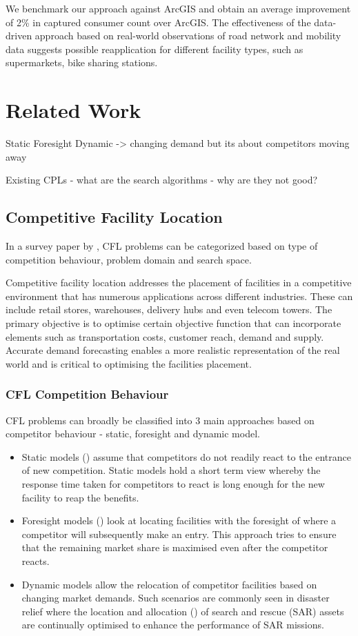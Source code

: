 \documentclass{ecai}
\begin{document}
We benchmark our approach against ArcGIS and obtain an average improvement of 2\% in captured consumer count over ArcGIS. The effectiveness of the data-driven approach based on real-world observations of road network and mobility data suggests possible reapplication for different facility types, such as supermarkets, bike sharing stations.


\section{Related Work}
Static
Foresight
Dynamic -> changing demand but its about competitors moving away

Existing CPLs
- what are the search algorithms
- why are they not good?

\subsection{Competitive Facility Location}
In a survey paper by \cite{mishra2022location}, CFL problems can be categorized based on type of competition behaviour, problem domain and search space.

Competitive facility location addresses the placement of facilities in a competitive environment that has numerous applications across different industries. These can include retail stores, warehouses, delivery hubs and even telecom towers. The primary objective is to optimise certain objective function that can incorporate elements such as transportation costs, customer reach, demand and supply. Accurate demand forecasting enables a more realistic representation of the real world and is critical to optimising the facilities placement.

\subsubsection{CFL Competition Behaviour}
CFL problems can broadly be classified into 3 main approaches based on competitor behaviour - static, foresight and dynamic model. 
\begin{itemize}
    \item Static models (\cite{plastria2001static}) assume that competitors do not readily react to the entrance of new competition. Static models hold a short term view whereby the response time taken for competitors to react is long enough for the new facility to reap the benefits. 
    \item Foresight models (\cite{plastria2008discrete}) look at locating facilities with the foresight of where a competitor will subsequently make an entry. This approach tries to ensure that the remaining market share is maximised even after the competitor reacts. 
    \item Dynamic models allow the relocation of competitor facilities based on changing market demands. Such scenarios are commonly seen in disaster relief where the location and allocation (\cite{karatas2021dynamic}) of search and rescue (SAR) assets are continually optimised to enhance the performance of SAR missions.
\end{itemize}
\end{document}
